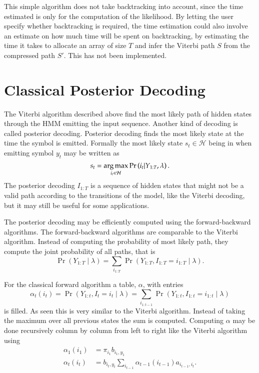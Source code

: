 This simple algorithm does not take backtracking into account, since the time
estimated is only for the computation of the likelihood. By letting the user
specify whether backtracking is required, the time estimation could also
involve an estimate on how much time will be spent on backtracking, by
estimating the time it takes to allocate an array of size $T$ and
infer the Viterbi path $S$ from the compressed path $S'$. This has
not been implemented.

\section{Classical Posterior Decoding}
\label{sec:posterior-decoding-1}

The Viterbi algorithm described above find the most likely path of hidden
states through the HMM emitting the input sequence. Another kind of decoding is
called posterior decoding. Posterior decoding finds the most likely state at
the time the symbol is emitted. Formally the most likely state
$s_t \in \mathcal{H}$ being in when emitting symbol $y_t$ may be written as
\begin{equation*}
  s_t = \operatorname*{arg\,max}_{i_t \in \mathcal{H}} \Pr \left(i_t | Y_{1:T}, \lambda \right).
\end{equation*}
The posterior decoding $I_{1:T}$ is a sequence of hidden states that might not
be a valid path according to the transitions of the model, like the Viterbi
decoding, but it may still be useful for some applications.

The posterior decoding may be efficiently computed using the forward-backward
algorithms. The forward-backward algorithms are comparable to the Viterbi
algorithm. Instead of computing the probability of most likely path, they
compute the joint probability of all paths, that is
\begin{equation*}
  \Pr
  \left(
    Y_{1:T} \mid \lambda
  \right) = \sum_{i_{1:T}} \Pr
  \left(
    Y_{1:T}, I_{1:T} = i_{1:T} \mid \lambda
  \right).
\end{equation*}

For the classical forward algorithm a table, $\alpha$, with entries
\begin{equation*}
\alpha_t(i_t) = \Pr \left( Y_{1:t}, I_t = i_t \mid \lambda \right) =
\sum_{i_{1:t-1}} \Pr \left( Y_{1:t}, I_{1:t} = i_{1:t} \mid \lambda \right)
\end{equation*}
is filled. As seen this is very similar to the Viterbi algorithm. Instead of
taking the maximum over all previous states the sum is computed. Computing
$\alpha$ may be done recursively column by column from left to right like the
Viterbi algorithm using
\begin{equation}
  \label{eq:8}
  \begin{aligned}
    \alpha_1(i_1) &= \pi_{i_1} b_{i_1, y_1} \\
    \alpha_t(i_t) &= b_{i_t, y_t} \sum_{i_{t - 1}} \alpha_{t - 1}(i_{t - 1})
    a_{i_{t - 1}, i_t}.
  \end{aligned}
\end{equation}

